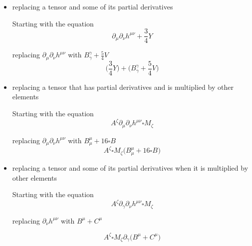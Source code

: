 \documentclass{article}
\def\){\Big)}
\def\({\Big(}
\begin{document}
{\begin{itemize}
Starting with the equation
\begin{equation}
\partial_{\mu} \partial_{\nu} h^{\mu \nu} + \frac{3}{4} Y
\end{equation}

replacing $ \partial_{\mu} \partial_{\nu} h^{\mu \nu} $ with $ \partial_{\gamma} B^{\gamma} + 5 + G^{\mu}_{\mu} $
\begin{equation}
\(\frac{3}{4} Y \)+\( \partial_{\gamma} B^{\gamma} +5 + G_{\mu}^{\mu} \)
\end{equation}


\item{replacing a tensor and some of its partial derivatives}



Starting with the equation
\begin{equation}
\partial_{\mu} \partial_{\nu} h^{\mu \nu} + \frac{3}{4} Y
\end{equation}

replacing $ \partial_{\mu} \partial_{\nu} h^{\mu \nu} $ with $ B^{\gamma}_{\gamma} + \frac{5}{4}V $
\begin{equation}
\(\frac{3}{4} Y \)+\( B_{\gamma}^{\gamma} +\frac{5}{4} V \)
\end{equation}


\item{replacing a tensor that has partial derivatives and is multiplied by other elements}

Starting with the equation
\begin{equation}
A^{\zeta} \partial_{\mu} \partial_{\nu} h^{\mu \nu} \square M_{\zeta}
\end{equation}

replacing $ \partial_{\mu} \partial_{\nu} h^{\mu \nu} $ with $ B^{\mu}_{\mu} + 16\square B^{} $
\begin{equation}
A^{\zeta} \square M_{\zeta} \( B_{\mu}^{\mu} +16 \square B^{} \)
\end{equation}

\item{ replacing a tensor and some of its partial derivatives when it is multiplied by other elements}

Starting with the equation
\begin{equation}
A^{\zeta} \partial_{\gamma} \partial_{\nu} h^{\mu \nu} \square M_{\zeta}
\end{equation}

replacing $ \partial_{\nu} h^{\mu \nu} $ with $ B^{\mu} + C^{\mu} $

\begin{equation}
A^{\zeta} \square M_{\zeta} \partial_{\gamma} \( B^{\mu} + C^{\mu} \)
\end{equation}



\end{itemize}}
\end{document}
